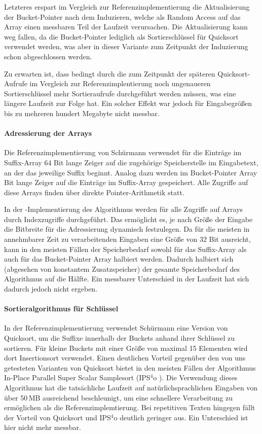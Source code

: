 Letzteres erspart im Vergleich zur Referenzimplementierung die Aktualisierung der Bucket-Pointer nach dem Induzieren, welche als Random Access auf das Array einen messbaren Teil der Laufzeit verursachen. Die Aktualisierung kann weg fallen, da die Bucket-Pointer lediglich als Sortierschlüssel für Quicksort verwendet werden, was aber in dieser Variante zum Zeitpunkt der Induzierung schon abgeschlossen werden.\par
Zu erwarten ist, dass bedingt durch die zum Zeitpunkt der späteren Quicksort-Aufrufe im Vergleich zur Referenzimplentierung noch ungenaueren Sortierschlüssel mehr Sortieraufrufe durchgeführt werden müssen, was eine längere Laufzeit zur Folge hat. Ein solcher Effekt war jedoch für Eingabegrößen bis zu mehreren hundert Megabyte nicht messbar.

\paragraph{Adressierung der Arrays}
Die Referenzimplementierung von Schürmann verwendet für die Einträge im Suffix-Array 64 Bit lange Zeiger auf die zugehörige Speicherstelle im Eingabetext, an der das jeweilige Suffix beginnt. Analog dazu werden im Bucket-Pointer Array  Bit lange Zeiger auf die Einträge im Suffix-Array gespeichert. Alle Zugriffe auf diese Arrays finden über direkte Pointer-Arithmetik statt.\par
In der \sacabench-Implementierung des Algorithmus werden für alle Zugriffe auf Arrays durch Indexzugriffe durchgeführt. Das ermöglicht es, je nach Größe der Eingabe die Bitbreite für die Adressierung dynamisch festzulegen. Da für die meisten in annehmbarer Zeit zu verarbeitenden Eingaben eine Größe von 32 Bit ausreicht, kann in den meisten Fällen der Speicherbedarf sowohl für das Suffix-Array als auch für das Bucket-Pointer Array halbiert werden. Dadurch halbiert sich (abgesehen von konstantem Zusatzspeicher) der gesamte Speicherbedarf des Algorithmus auf die Hälfte. Ein messbarer Unterschied in der Laufzeit hat sich dadurch jedoch nicht ergeben.

\paragraph{Sortieralgorithmus für Schlüssel}
In der Referenzimplementierung verwendet Schürmann eine Version von Quicksort, um die Suffixe innerhalb der Buckets anhand ihrer Schlüssel zu sortieren. Für kleine Buckets mit einer Größe von maximal 15 Elementen wird dort Insertionsort verwendet. Einen deutlichen Vorteil gegenüber den von uns getesteten Varianten von Quicksort bietet in den meisten Fällen der Algorithmus In-Place Parallel Super Scalar Samplesort (IPS\(^4\)o \cite{axtmann2017}). Die Verwendung dieses Algorithmus hat die tatsächliche Laufzeit auf natürlichsprachlichen Eingaben von über 50\,MB ausreichend beschleunigt, um eine schnellere Verarbeitung zu ermöglichen als die Referenzimplemtierung. Bei repetitiven Texten hingegen fällt der Vorteil von Quicksort und IPS\(^4\)o deutlich geringer aus. Ein Unterschied ist hier nicht mehr messbar.
